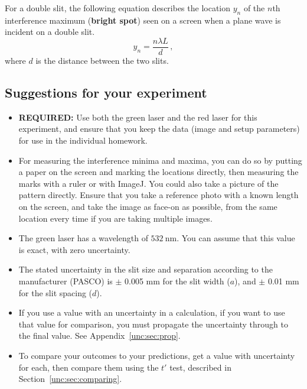 For a double slit, the following equation describes the location $y_n$ of the $n$th interference maximum (\textbf{bright spot}) seen on a screen when a plane wave is incident on a double slit.
\begin{equation}
y_n = \frac{n \lambda L}{d} \,,
\end{equation}
where $d$ is the distance between the two slits.

\subsection{Suggestions for your experiment}

\begin{itemize}
	
	\item \textbf{REQUIRED:} Use both the green laser and the red laser for this experiment, and ensure that you keep the data (image and setup parameters) for use in the individual homework.
	
	\item For measuring the interference minima and maxima, you can do so by putting a paper on the screen and marking the locations directly, then measuring the marks with a ruler or with ImageJ. You could also take a picture of the pattern directly. Ensure that you take a reference photo with a known length on the screen, and take the image as face-on as possible, from the same location every time if you are taking multiple images.
	
	\item The green laser has a wavelength of $532\:$nm. You can assume that this value is exact, with zero uncertainty.
	
	\item The stated uncertainty in the slit size and separation according to the manufacturer (PASCO) is $\pm$ 0.005 mm for the slit width ($a$), and $\pm$ 0.01 mm for the slit spacing ($d$).
	
	\item If you use a value with an uncertainty in a calculation, if you want to use that value for comparison, you must propagate the uncertainty through to the final value. See Appendix~\ref{unc:sec:prop}.
	
	\item To compare your outcomes to your predictions, get a value with uncertainty for each, then compare them using the $t'$ test, described in Section~\ref{unc:sec:comparing}.
\end{itemize}

